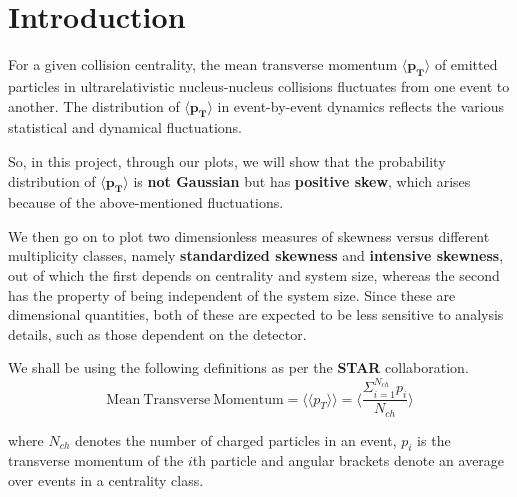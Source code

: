 \documentclass[letterpaper,aps,prc,superscriptaddress,nofootinbib,10pt,showpacs,floatfix]{revtex4-2}%
\newcommand{\bfrac}[2]{\frac{\displaystyle #1}{\displaystyle #2}}
\begin{document}
\section{Introduction}
\vspace{-2mm}


For a given collision centrality, the mean transverse momentum $\mathbf{\langle  p_T\rangle}$ of emitted particles in ultrarelativistic nucleus-nucleus collisions fluctuates from one event to another. The distribution of $\mathbf{\langle  p_T\rangle}$ in event-by-event dynamics reflects the various statistical and dynamical fluctuations.
 
So, in this project, through our plots, we will show that the probability distribution of $\mathbf{\langle  p_T\rangle}$ is \textbf{not Gaussian} but has \textbf{positive skew}, which arises because of the above-mentioned fluctuations.

We then go on to plot two dimensionless measures of skewness versus different multiplicity classes, namely \textbf{standardized skewness} and \textbf{intensive skewness}, out of which the first depends on centrality and system size, whereas the second has the property of being independent of the system size. Since these are dimensional quantities, both of these are expected to be less sensitive to analysis details,
such as those dependent on the detector.

We shall be using the following definitions as per the \textbf{STAR} collaboration.
\vspace{-1mm}
\begin{equation}
\label{eq:1}
\mathrm{Mean\ Transverse\ Momentum}=\langle \langle p_T\rangle \rangle =\langle \bfrac{\Sigma_{i=1}^{N_{ch}} p_i}{N_{ch}}\rangle 
\end{equation}

where $N_{ch}$ denotes the number of charged particles in an event, $p_i$ is the transverse momentum of the $i$th particle and angular brackets denote an average over events in a centrality class.
\end{document}
